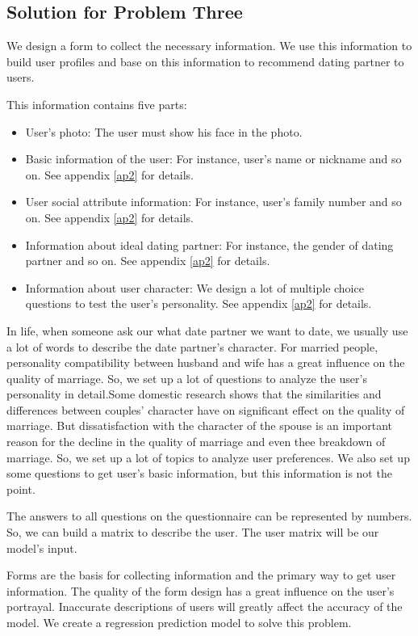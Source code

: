 \subsection{Solution for Problem Three}
We design a form to collect the necessary information. We use this information to build user profiles and base on this information to recommend dating partner to users.\par 
This information contains five parts:
\begin{itemize}
	\item User's photo: The user must show his face in the photo.
	\item Basic information of the user: For instance, user's name or nickname and so on. See appendix \ref{ap2} for details.
	\item User social attribute information: For instance, user's family number and so on. See appendix \ref{ap2} for details.
	\item Information about ideal dating partner: For instance, the gender of dating partner and so on. See appendix \ref{ap2} for details. 
	\item Information about user character: We design a lot of multiple choice questions to test the user's personality. See appendix \ref{ap2} for details.
\end{itemize}
\par 
In life, when someone ask our what date partner we want to date, we usually use a lot of words to describe the date partner's character. For married people, personality compatibility between husband and wife has a great influence on the quality of marriage\cite{3}. So, we set up a lot of questions to analyze the user's personality in detail.Some domestic research shows that the similarities and differences between couples' character have on significant effect on the quality of marriage. But dissatisfaction with the character of the spouse is an important reason for the decline in the quality of marriage and even thee breakdown of marriage\cite{4}. So, we set up a lot of topics to analyze user preferences. We also set up some questions to get user's basic information, but this information is not the point.\par 
The answers to all questions on the questionnaire can be represented by numbers. So, we can build a matrix to describe the user. The user matrix will be our model's input.\par 
Forms are the basis for collecting information and the primary way to get user information. The quality of the form design has a great influence on the user's portrayal. Inaccurate descriptions of users will greatly affect the accuracy of the model. We create a regression prediction model to solve this problem.\par 
